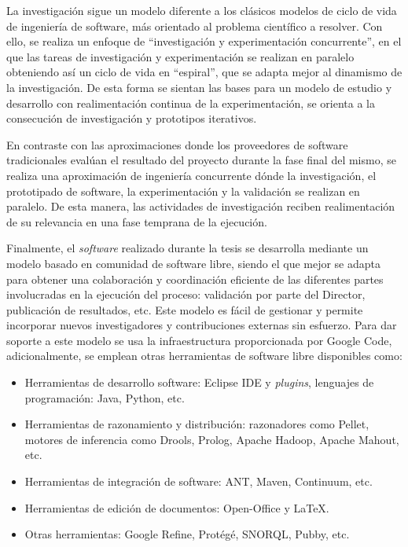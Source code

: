 La investigación sigue un modelo diferente a los clásicos modelos de ciclo de vida de ingeniería de software,
 más orientado al problema científico a resolver. Con ello, se realiza un enfoque de ``investigación y experimentación concurrente'', 
en el que las tareas de investigación y experimentación se realizan en paralelo obteniendo 
así un ciclo de vida en ``espiral'', que se adapta mejor al dinamismo de la investigación. De esta forma se sientan las bases para un modelo
de estudio y desarrollo con realimentación continua de la experimentación, se orienta a la consecución de investigación y prototipos iterativos.

En contraste con las aproximaciones donde los proveedores de software tradicionales evalúan el resultado del proyecto durante la fase final del mismo,
se realiza una aproximación de ingeniería concurrente dónde la investigación, el prototipado de software, 
la experimentación y la validación se realizan en paralelo. De esta manera, las actividades de investigación reciben realimentación de su
relevancia en una fase temprana de la ejecución.

Finalmente, el \textit{software} realizado durante la tesis se desarrolla mediante un modelo basado en comunidad
de software libre, siendo el que mejor se adapta para obtener una
colaboración y coordinación eficiente de las diferentes partes involucradas en la ejecución
del proceso: validación por parte del Director, publicación de resultados, etc.
 Este modelo es fácil de gestionar y permite incorporar nuevos investigadores y contribuciones 
externas sin esfuerzo. Para dar soporte a este modelo se usa la infraestructura proporcionada por Google Code, adicionalmente, 
se emplean otras herramientas de software libre disponibles como:
\begin{itemize}
 \item Herramientas de desarrollo software: \gls{Eclipse} IDE y \textit{plugins}, lenguajes de
programación: Java, Python, etc.
 \item Herramientas de razonamiento y distribución: razonadores como Pellet, motores de
inferencia como Drools, Prolog, Apache Hadoop, Apache \gls{Mahout}, etc.
\item Herramientas de integración de software: \gls{ANT}, \gls{Maven}, Continuum, etc.
 \item Herramientas de edición de documentos: Open-Office y LaTeX.
\item Otras herramientas: Google \gls{Refine}, Protégé, \gls{SNORQL}, \gls{Pubby}, etc.
\end{itemize}

